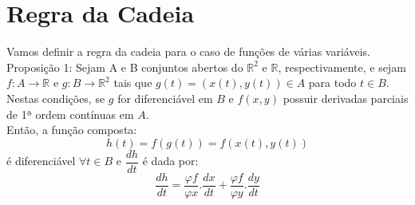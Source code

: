 \documentclass{article}
\begin{document}
	\section{Regra da Cadeia}
		Vamos definir a regra da cadeia para o caso de funções de várias variáveis.\\
		Proposição 1: Sejam A e B conjuntos abertos do $\mathbb{R}^2$ e $\mathbb{R}$, respectivamente, e sejam $f:A \to \mathbb{R}$ e $g:B \to \mathbb{R}^2$ tais que $g(t) = (x(t),y(t)) \in A$ para todo $t \in B$. Nestas condições, se $g$ for diferenciável em $B$ e $f(x,y)$ possuir derivadas parciais de 1ª ordem contínuas em $A$.\\
		Então, a função composta:\\
			$$h(t)= f(g(t))=f(x(t),y(t))$$
		é diferenciável $\forall t \in B$ e $\dfrac{dh}{dt}$ é dada por:
			$$\dfrac{dh}{dt} = \dfrac{\varphi f}{\varphi x}. \dfrac{dx}{dt}+\dfrac{\varphi f}{\varphi y}.\dfrac{dy}{dt}$$
 
\end{document}

